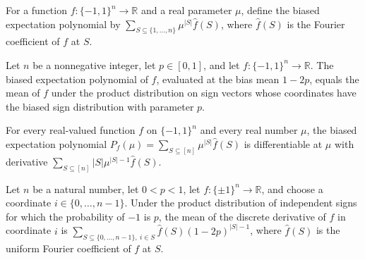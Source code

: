\begin{definition}
\label{FABL.biasedExpectationPolynomial}
\leanok
{}
For a function $f:\{-1,1\}^n\to\mathbb{R}$ and a real parameter $\mu$, define the biased
expectation polynomial by $\sum_{S\subseteq\{1,\ldots,n\}}\mu^{|S|}\widehat f(S)$, where
$\widehat f(S)$ is the Fourier coefficient of $f$ at $S$.
\end{definition}

\begin{theorem}
\label{FABL.biasedExpectationPolynomial_biasMean}
\leanok
{}
Let $n$ be a nonnegative integer, let $p\in[0,1]$, and let $f:\{-1,1\}^n\to\mathbb R$.
The biased expectation polynomial of $f$, evaluated at the bias mean $1-2p$, equals the
mean of $f$ under the product distribution on sign vectors whose coordinates have the
biased sign distribution with parameter $p$.
\end{theorem}

\begin{theorem}
\label{FABL.hasDerivAt_biasedExpectationPolynomial}
\leanok
{}
For every real-valued function $f$ on $\{-1,1\}^n$ and every real number $\mu$, the
biased expectation polynomial $P_f(\mu)=\sum_{S\subseteq[n]}\mu^{|S|}\widehat f(S)$
is differentiable at $\mu$ with derivative
$\sum_{S\subseteq[n]}|S|\mu^{|S|-1}\widehat f(S)$.
\end{theorem}

\begin{theorem}
\label{FABL.productMean_biasedSignPMF_discreteDerivative}
\leanok
{}
Let $n$ be a natural number, let $0<p<1$, let $f:\{\pm1\}^n\to\mathbb R$, and choose a
coordinate $i\in\{0,\ldots,n-1\}$. Under the product distribution of independent signs
for which the probability of $-1$ is $p$, the mean of the discrete derivative of $f$ in
coordinate $i$ is $\displaystyle\sum_{S\subseteq\{0,\ldots,n-1\},\ i\in S}\widehat
f(S)(1-2p)^{|S|-1}$, where $\widehat f(S)$ is the uniform Fourier coefficient of $f$ at
$S$.
\end{theorem}

